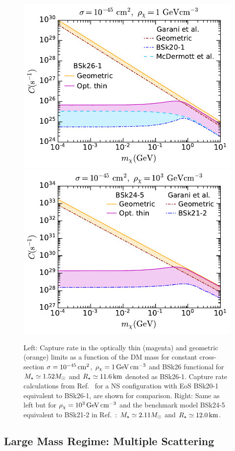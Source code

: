 \begin{figure}
    \centering
    \includegraphics[width=.48\textwidth]{capture_1/capture_rate_n0_comp1.pdf}
    \includegraphics[width=.48\textwidth]{capture_1/capture_rate_n0_comp2.pdf}    
    \caption{Left: Capture rate in the optically thin  (magenta) and geometric (orange) limits as a function of the DM mass for constant cross-section $\sigma=10^{-45}{\rm \,cm}^2$, $\rho_\chi=1{\rm \,GeV}{\rm \,cm}^{-3}$ and BSk26 functional for $M_\star\simeq1.52M_\odot$ and $R_\star\simeq11.6{\rm \,km}$ denoted as BSk26-1. Capture rate calculations from Ref.~\cite{Garani:2018kkd_may_NewAnalysisNeutron} for a NS configuration with EoS BSk20-1~\cite{Potekhin:2013qqa_Analyticalrepresentationsunified} equivalent to BSk26-1, are shown for comparison. Right: Same as left but for $\rho_\chi=10^3{\rm \,GeV}{\rm \,cm}^{-3}$ and the benchmark model BSk24-5 equivalent to BSk21-2 in Ref.~\cite{Garani:2018kkd_may_NewAnalysisNeutron}: $M_\star\simeq2.11M_\odot$ and $R_\star\simeq12.0{\rm \,km}$. 
    }
    \label{ch3:fig:Cratecomp}
\end{figure}

\subsection{Large Mass Regime: Multiple Scattering}
\label{ch4:subsec:largemassandsigma}


